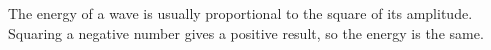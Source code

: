 The energy of a wave is usually proportional to the square of its amplitude. Squaring
a negative number gives a positive result, so the energy is the same.



